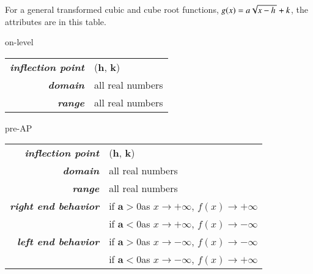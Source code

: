 For a general transformed cubic and cube root functions,
$g(x) = a \myRoot{x-h} + k$, 
the attributes 
are in this table.

\begin{taggedblock}{on-level}
    \begin{myCenteredBox}[width=4.5in,]
        \Large
        \begin{center}
        \begin{tabular}{r||l}
            {\bfseries\itshape inflection point}     
                & (${\boldsymbol h}$, ${\boldsymbol k}$)  \\
            {\bfseries\itshape domain}               
                & all real numbers  \\
            {\bfseries\itshape range}               
                & all real numbers  \\
        \end{tabular}
        \end{center}
    \end{myCenteredBox}
\end{taggedblock}

\begin{taggedblock}{pre-AP}
    \begin{myCenteredBox}[width=6.25in,]
        \Large
        \begin{center}
        \begin{tabular}{r||l}
            {\bfseries\itshape inflection point}     
                & (${\boldsymbol h}$, ${\boldsymbol k}$)  \\
            {\bfseries\itshape domain}               
                & all real numbers  \\
            {\bfseries\itshape range}               
                & all real numbers  \\
            \midrule
            {\bfseries\itshape right end behavior}   
                & if ${\boldsymbol a>0}$\quad  as $x \rightarrow +\infty$, $f(x) \rightarrow +\infty$ \\
            
                & if ${\boldsymbol a<0}$\quad  as $x \rightarrow +\infty$, $f(x) \rightarrow -\infty$ \\
            \midrule
            {\bfseries\itshape left end behavior}    
            & if ${\boldsymbol a>0}$\quad  as $x \rightarrow -\infty$, $f(x) \rightarrow -\infty$ \\
            & if ${\boldsymbol a<0}$\quad  as $x \rightarrow -\infty$, $f(x) \rightarrow +\infty$ \\
        \end{tabular}
        \end{center}
    \end{myCenteredBox}
\end{taggedblock}


